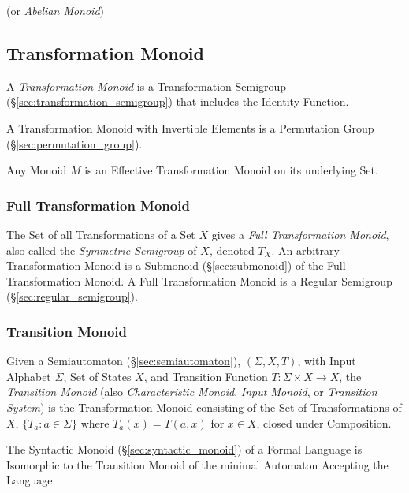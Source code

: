 (or \emph{Abelian Monoid})



\subsection{Transformation Monoid}\label{sec:transformation_monoid}

A \emph{Transformation Monoid} is a Transformation Semigroup
(\S\ref{sec:transformation_semigroup}) that includes the Identity
Function.

A Transformation Monoid with Invertible Elements is a Permutation
Group (\S\ref{sec:permutation_group}).

Any Monoid $M$ is an Effective Transformation Monoid on its underlying
Set.



\subsubsection{Full Transformation Monoid}\label{sec:full_transformation}

The Set of all Transformations of a Set $X$ gives a \emph{Full
  Transformation Monoid}, also called the \emph{Symmetric Semigroup}
of $X$, denoted $T_X$. An arbitrary Transformation Monoid is a
Submonoid (\S\ref{sec:submonoid}) of the Full Transformation Monoid. A
Full Transformation Monoid is a Regular Semigroup
(\S\ref{sec:regular_semigroup}).



\subsubsection{Transition Monoid}\label{sec:transition_monoid}

Given a Semiautomaton (\S\ref{sec:semiautomaton}), $(\Sigma, X, T)$,
with Input Alphabet $\Sigma$, Set of States $X$, and Transition
Function $T : \Sigma \times X \rightarrow X$, the \emph{Transition
  Monoid} (also \emph{Characteristic Monoid}, \emph{Input Monoid}, or
\emph{Transition System}) is the Transformation Monoid consisting of
the Set of Transformations of $X$, $\{T_a : a \in \Sigma\}$ where
$T_a(x) = T(a,x)$ for $x \in X$, closed under Composition.

The Syntactic Monoid (\S\ref{sec:syntactic_monoid}) of a Formal
Language is Isomorphic to the Transition Monoid of the minimal
Automaton Accepting the Language.



